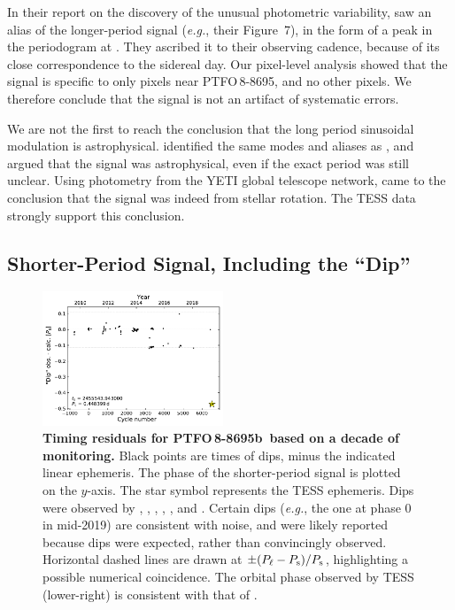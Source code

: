 \documentclass[12pt,twocolumn,tighten]{aastex62}
\newcommand{\ptfo}{PTFO$\,$8-8695}
\newcommand{\ptfob}{PTFO$\,$8-8695b}
\begin{document}
In their report on the discovery of the unusual photometric
variability, \citet{van_eyken_ptf_2012} saw an alias of the
longer-period signal ({\it e.g.}, their Figure~7), in the form of a
peak in the periodogram at . They ascribed it to their
observing cadence, because of its close correspondence to the sidereal
day.  Our pixel-level analysis showed that the signal is specific to
only pixels near \ptfo, and no other pixels.  We therefore conclude
that the signal is not an artifact of systematic errors.

We are not the first to reach the conclusion that the long period
sinusoidal modulation is astrophysical.  \citet{koen_multicolour_2015}
identified the same modes and aliases as \citet{van_eyken_ptf_2012},
and argued that the signal was astrophysical, even if the exact period
was still unclear.  Using photometry from the YETI global telescope
network, \citet{raetz_yeti_2016} came to the conclusion that the
 signal was indeed from stellar
rotation.  The TESS data strongly support this conclusion.



\subsection{Shorter-Period Signal, Including the ``Dip''}

\begin{figure}[t]
	\begin{center}
		\leavevmode
		\includegraphics[width=0.48\textwidth]{f6.pdf}
	\end{center}
	\vspace{-0.7cm}
	\caption{
    {\bf Timing residuals for \ptfob\ based on a decade of
    monitoring.} Black points are times of dips, minus the indicated
    linear ephemeris.  The phase of the shorter-period signal is
    plotted on the $y$-axis. The star symbol represents the TESS
    ephemeris.  Dips were observed by \citet{van_eyken_ptf_2012},
    \citet{ciardi_followup_2015}, \citet{yu_tests_2015},
    \citet{raetz_yeti_2016}, \citet{onitsuka_multicolor_2017}, and
    \citet{tanimoto_evidence_2020}.  Certain dips ({\it e.g.}, the one
    at phase 0 in mid-2019) are consistent with noise, and were likely
    reported because dips were expected, rather than convincingly
    observed.  Horizontal dashed lines are drawn at $\pm (P_{\rm \ell}
    - P_{\rm s})/P_{\rm s}$, highlighting a possible numerical
    coincidence.  The orbital phase observed by TESS (lower-right) is
    consistent with that of \citet{tanimoto_evidence_2020}.
		\label{fig:o_minus_c}
	}
\end{figure}
\end{document}

